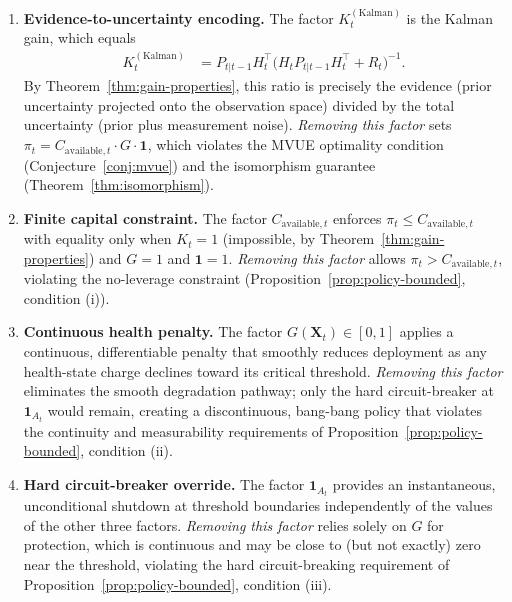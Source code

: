 \documentclass[12pt,openany]{book}
\numberwithin{equation}{chapter}
\theoremstyle{plain}
\theoremstyle{definition}
\theoremstyle{remark}
\def\mathcal#1{#1}%
\begin{document}
\begin{enumerate}

  \item \textbf{Evidence-to-uncertainty encoding.}
        The factor $K_t^{(\mathrm{Kalman})}$ is the Kalman gain,
        which equals
        \begin{align}
          K_t^{(\mathrm{Kalman})}
            &= P_{t|t-1} H_t^\top
               \bigl(H_t P_{t|t-1} H_t^\top + R_t\bigr)^{-1}.
               \label{eq:gain-audit}
        \end{align}
        By Theorem~\ref{thm:gain-properties}, this ratio is
        precisely the evidence (prior uncertainty projected
        onto the observation space) divided by the total
        uncertainty (prior plus measurement noise).
        \newline
        \emph{Removing this factor} sets $\pi_t =
        C_{\mathrm{available},t} \cdot G \cdot \mathbf{1}$,
        which violates the MVUE optimality condition
        (Conjecture~\ref{conj:mvue}) and the isomorphism
        guarantee (Theorem~\ref{thm:isomorphism}).

  \item \textbf{Finite capital constraint.}
        The factor $C_{\mathrm{available},t}$ enforces
        $\pi_t \le C_{\mathrm{available},t}$ with equality only
        when $K_t = 1$ (impossible, by Theorem~\ref{thm:gain-properties})
        and $G = 1$ and $\mathbf{1} = 1$.
        \newline
        \emph{Removing this factor} allows $\pi_t > C_{\mathrm{available},t}$,
        violating the no-leverage constraint
        (Proposition~\ref{prop:policy-bounded}, condition (i)).

  \item \textbf{Continuous health penalty.}
        The factor $G(\mathbf{X}_t) \in [0,1]$ applies a
        continuous, differentiable penalty that smoothly
        reduces deployment as any health-state charge declines
        toward its critical threshold.
        \newline
        \emph{Removing this factor} eliminates the smooth
        degradation pathway; only the hard circuit-breaker
        at $\mathbf{1}_{\mathcal{A}_t}$ would remain, creating
        a discontinuous, bang-bang policy that violates the
        continuity and measurability requirements of
        Proposition~\ref{prop:policy-bounded}, condition (ii).

  \item \textbf{Hard circuit-breaker override.}
        The factor $\mathbf{1}_{\mathcal{A}_t}$ provides an
        instantaneous, unconditional shutdown at threshold
        boundaries independently of the values of the other
        three factors.
        \newline
        \emph{Removing this factor} relies solely on $G$ for
        protection, which is continuous and may be close to
        (but not exactly) zero near the threshold, violating
        the hard circuit-breaking requirement of
        Proposition~\ref{prop:policy-bounded}, condition (iii).

\end{enumerate}
\end{document}
